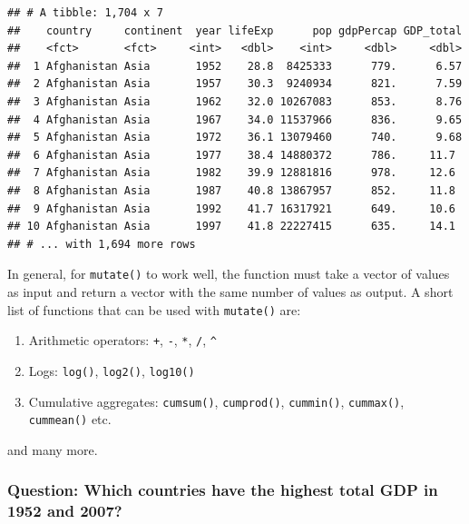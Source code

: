 \documentclass[12pt,]{article}
\newenvironment{Shaded}{\begin{snugshade}}{\end{snugshade}}
\newcommand{\KeywordTok}[1]{\textcolor[rgb]{0.13,0.29,0.53}{\textbf{#1}}}
\newcommand{\DecValTok}[1]{\textcolor[rgb]{0.00,0.00,0.81}{#1}}
\newcommand{\StringTok}[1]{\textcolor[rgb]{0.31,0.60,0.02}{#1}}
\newcommand{\OperatorTok}[1]{\textcolor[rgb]{0.81,0.36,0.00}{\textbf{#1}}}
\newcommand{\NormalTok}[1]{#1}
\providecommand{\tightlist}{%
  \setlength{\itemsep}{0pt}\setlength{\parskip}{0pt}}
\begin{document}
\begin{verbatim}
## # A tibble: 1,704 x 7
##    country     continent  year lifeExp      pop gdpPercap GDP_total
##    <fct>       <fct>     <int>   <dbl>    <int>     <dbl>     <dbl>
##  1 Afghanistan Asia       1952    28.8  8425333      779.      6.57
##  2 Afghanistan Asia       1957    30.3  9240934      821.      7.59
##  3 Afghanistan Asia       1962    32.0 10267083      853.      8.76
##  4 Afghanistan Asia       1967    34.0 11537966      836.      9.65
##  5 Afghanistan Asia       1972    36.1 13079460      740.      9.68
##  6 Afghanistan Asia       1977    38.4 14880372      786.     11.7 
##  7 Afghanistan Asia       1982    39.9 12881816      978.     12.6 
##  8 Afghanistan Asia       1987    40.8 13867957      852.     11.8 
##  9 Afghanistan Asia       1992    41.7 16317921      649.     10.6 
## 10 Afghanistan Asia       1997    41.8 22227415      635.     14.1 
## # ... with 1,694 more rows
\end{verbatim}

In general, for \texttt{mutate()} to work well, the function must take a
vector of values as input and return a vector with the same number of
values as output. A short list of functions that can be used with
\texttt{mutate()} are:

\begin{enumerate}
\def\labelenumi{\arabic{enumi}.}
\tightlist
\item
  Arithmetic operators: \texttt{+}, \texttt{-}, \texttt{*}, \texttt{/},
  \texttt{\^{}}
\item
  Logs: \texttt{log()}, \texttt{log2()}, \texttt{log10()}
\item
  Cumulative aggregates: \texttt{cumsum()}, \texttt{cumprod()},
  \texttt{cummin()}, \texttt{cummax()}, \texttt{cummean()} etc.
\end{enumerate}

and many more.

\subsubsection{Question: Which countries have the highest total GDP in
1952 and
2007?}\label{question-which-countries-have-the-highest-total-gdp-in-1952-and-2007}

\begin{Shaded}
\end{Shaded}
\end{document}
